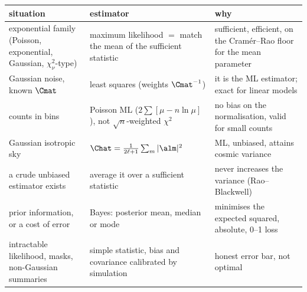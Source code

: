 \begin{taxonomy}
\small
\begin{tabular}{@{}>{\raggedright\arraybackslash}p{3.7cm}>{\raggedright\arraybackslash}p{3.9cm}>{\raggedright\arraybackslash}p{4.0cm}@{}}
  situation & estimator & why\\
  \hline
  exponential family (Poisson, exponential, Gaussian, $\chi^2_\nu$-type)
    & maximum likelihood $=$ match the mean of the sufficient statistic
    & sufficient, efficient, on the Cram\'er--Rao floor for the mean parameter\\[2pt]
  Gaussian noise, known $\Cmat$
    & least squares (weights $\Cmat^{-1}$)
    & it is the ML estimator; exact for linear models\\[2pt]
  counts in bins
    & Poisson ML ($2\sum[\mu-n\ln\mu]$), not $\sqrt n$-weighted $\chi^2$
    & no bias on the normalisation, valid for small counts\\[2pt]
  Gaussian isotropic sky
    & $\Chat=\frac1{2\ell+1}\sum_m|\alm|^2$
    & ML, unbiased, attains cosmic variance\\[2pt]
  a crude unbiased estimator exists
    & average it over a sufficient statistic
    & never increases the variance (Rao--Blackwell)\\[2pt]
  prior information, or a cost of error
    & Bayes: posterior mean, median or mode
    & minimises the expected squared, absolute, 0--1 loss\\[2pt]
  intractable likelihood, masks, non-Gaussian summaries
    & simple statistic, bias and covariance calibrated by simulation
    & honest error bar, not optimal\\
\end{tabular}
\end{taxonomy}
\providecommand{\ThreeBHNaiveMean}{}\renewcommand{\ThreeBHNaiveMean}{69.49}
\providecommand{\ThreeBHNaiveBias}{}\renewcommand{\ThreeBHNaiveBias}{-0.5076}
\providecommand{\ThreeBHNaiveSd}{}\renewcommand{\ThreeBHNaiveSd}{0.6265}
\providecommand{\ThreeBHNaiveRmse}{}\renewcommand{\ThreeBHNaiveRmse}{0.8063}
\providecommand{\ThreeBHRatioMean}{}\renewcommand{\ThreeBHRatioMean}{70.24}
\providecommand{\ThreeBHRatioBias}{}\renewcommand{\ThreeBHRatioBias}{0.2388}
\providecommand{\ThreeBHRatioSd}{}\renewcommand{\ThreeBHRatioSd}{0.5362}
\providecommand{\ThreeBHRatioRmse}{}\renewcommand{\ThreeBHRatioRmse}{0.587}
\providecommand{\ThreeBHMLMean}{}\renewcommand{\ThreeBHMLMean}{70.03}
\providecommand{\ThreeBHMLBias}{}\renewcommand{\ThreeBHMLBias}{0.02722}
\providecommand{\ThreeBHMLSd}{}\renewcommand{\ThreeBHMLSd}{0.5191}
